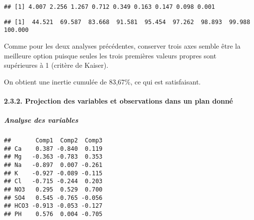 \documentclass[]{article}
\newenvironment{Shaded}{\begin{snugshade}}{\end{snugshade}}
\newcommand{\KeywordTok}[1]{\textcolor[rgb]{0.13,0.29,0.53}{\textbf{#1}}}
\newcommand{\DecValTok}[1]{\textcolor[rgb]{0.00,0.00,0.81}{#1}}
\newcommand{\OperatorTok}[1]{\textcolor[rgb]{0.81,0.36,0.00}{\textbf{#1}}}
\newcommand{\NormalTok}[1]{#1}
\let\oldparagraph\paragraph
\renewcommand{\paragraph}[1]{\oldparagraph{#1}\mbox{}}
\let\oldsubparagraph\subparagraph
\renewcommand{\subparagraph}[1]{\oldsubparagraph{#1}\mbox{}}
\begin{document}
\begin{Shaded}
\end{Shaded}

\begin{verbatim}
## [1] 4.007 2.256 1.267 0.712 0.349 0.163 0.147 0.098 0.001
\end{verbatim}

\begin{Shaded}
\end{Shaded}

\begin{verbatim}
## [1]  44.521  69.587  83.668  91.581  95.454  97.262  98.893  99.988 100.000
\end{verbatim}

Comme pour les deux analyses précédentes, conserver trois axes semble
être la meilleure option puisque seules les trois premières valeurs
propres sont supérieures à 1 (critère de Kaiser).

On obtient une inertie cumulée de 83,67\%, ce qui est satisfaisant.

\hypertarget{projection-des-variables-et-observations-dans-un-plan-donne-2}{\paragraph{2.3.2.
Projection des variables et observations dans un plan
donné}\label{projection-des-variables-et-observations-dans-un-plan-donne-2}}

\subparagraph{Analyse des variables}\label{analyse-des-variables-2}

\begin{Shaded}
\end{Shaded}

\begin{verbatim}
##       Comp1  Comp2  Comp3
## Ca    0.387 -0.840  0.119
## Mg   -0.363 -0.783  0.353
## Na   -0.897  0.007 -0.261
## K    -0.927 -0.089 -0.115
## Cl   -0.715 -0.244  0.203
## NO3   0.295  0.529  0.700
## SO4   0.545 -0.765 -0.056
## HCO3 -0.913 -0.053 -0.127
## PH    0.576  0.004 -0.705
\end{verbatim}
\end{document}
